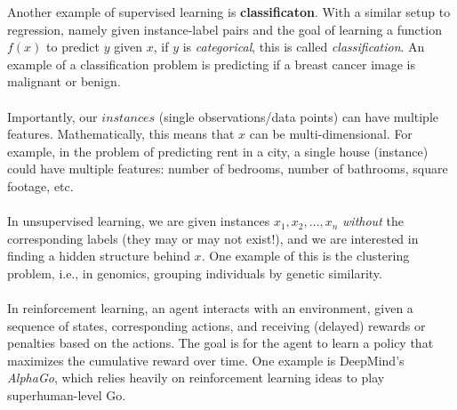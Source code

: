 \documentclass[11 pt]{scrartcl}
\begin{document}
Another example of supervised learning is \textbf{classificaton}. With a similar setup to regression, namely given instance-label pairs and the goal of learning a function $f(x)$ to predict $y$ given $x$, if $y$ is \textit{categorical}, this is called \textit{classification}. An example of a classification problem is predicting if a breast cancer image is malignant or benign. \\\\
Importantly, our $instances$ (single observations/data points) can have multiple features. Mathematically, this means that $x$ can be multi-dimensional. For example, in the problem of predicting rent in a city, a single house (instance) could have multiple features: number of bedrooms, number of bathrooms, square footage, etc. \\\\
In unsupervised learning, we are given instances $x_1, x_2, \ldots, x_n$ \textit{without} the corresponding labels (they may or may not exist!), and we are interested in finding a hidden structure behind $x$. One example of this is the clustering problem, i.e., in genomics, grouping individuals by genetic similarity. \\\\
In reinforcement learning, an agent interacts with an environment, given a sequence of states, corresponding actions, and receiving (delayed) rewards or penalties based on the actions. The goal is for the agent to learn a policy that maximizes the cumulative reward over time. One example is DeepMind's \textit{AlphaGo}, which relies heavily on reinforcement learning ideas to play superhuman-level Go. 
\end{document}
